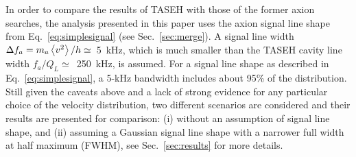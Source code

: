 In order to compare the results of TASEH with those of the former axion searches, 
the analysis presented in this paper uses the axion 
signal line shape from Eq.~\eqref{eq:simplesignal} (see Sec.~\ref{sec:merge}). 
A signal line width 
$\Delta f_a=m_a\left<v^2\right>/h\simeq$~5~kHz, which is much smaller than 
the TASEH cavity line width $f_a/Q_L\simeq$~250~kHz, is assumed. %
For a signal 
line shape as described in Eq.~\eqref{eq:simplesignal}, a 5-kHz bandwidth 
includes about 95\% of the distribution. 
Still given the caveats above and a lack of 
strong evidence for any particular choice of the velocity distribution, 
two different scenarios are considered and their results are 
presented for comparison: (i) without an assumption of signal line shape, and 
(ii) assuming a Gaussian signal line shape with a narrower full width at half 
maximum (FWHM), see Sec.~\ref{sec:results} for more details. 


 
